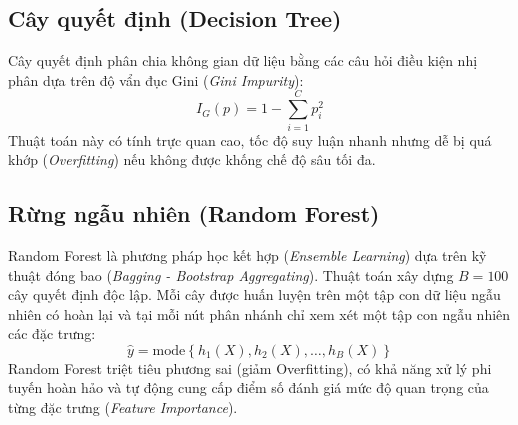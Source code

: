 \documentclass[12pt,a4paper,oneside]{report}
\begin{document}
\subsection{Cây quyết định (Decision Tree)}
Cây quyết định phân chia không gian dữ liệu bằng các câu hỏi điều kiện nhị phân dựa trên độ vẩn đục Gini (\textit{Gini Impurity}):
\begin{equation}
  I_G(p) = 1 - \sum_{i=1}^{C} p_i^2
\end{equation}
Thuật toán này có tính trực quan cao, tốc độ suy luận nhanh nhưng dễ bị quá khớp (\textit{Overfitting}) nếu không được khống chế độ sâu tối đa.

\subsection{Rừng ngẫu nhiên (Random Forest)}
Random Forest là phương pháp học kết hợp (\textit{Ensemble Learning}) dựa trên kỹ thuật đóng bao (\textit{Bagging - Bootstrap Aggregating}). Thuật toán xây dựng $B = 100$ cây quyết định độc lập. Mỗi cây được huấn luyện trên một tập con dữ liệu ngẫu nhiên có hoàn lại và tại mỗi nút phân nhánh chỉ xem xét một tập con ngẫu nhiên các đặc trưng:
\begin{equation}
  \hat{y} = \text{mode} \left\{ h_1(X), h_2(X), \dots, h_B(X) \right\}
\end{equation}
Random Forest triệt tiêu phương sai (giảm Overfitting), có khả năng xử lý phi tuyến hoàn hảo và tự động cung cấp điểm số đánh giá mức độ quan trọng của từng đặc trưng (\textit{Feature Importance}).
\end{document}
